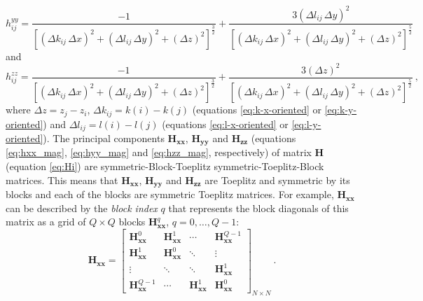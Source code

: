 \begin{equation}
	h^{yy}_{ij} = \frac{-1}{ \left[ 
		\left( \Delta k_{ij} \, \Delta x \right)^{2} + 
		\left( \Delta l_{ij} \, \Delta y \right)^{2} + 
		\left( \Delta z \right)^{2} \right]^{\frac{3}{2}}} + 
	\frac{3 (\Delta l_{ij} \, \Delta y )^{2}}{\left[ 
		\left( \Delta k_{ij} \, \Delta x \right)^{2} + 
		\left( \Delta l_{ij} \, \Delta y \right)^{2} + 
		\left( \Delta z \right)^{2} \right]^{\frac{5}{2}}} \: 
	\label{eq:hyy_mag}
\end{equation}
and
\begin{equation}
	h^{zz}_{ij} = \frac{-1}{ \left[ 
		\left( \Delta k_{ij} \, \Delta x \right)^{2} + 
		\left( \Delta l_{ij} \, \Delta y \right)^{2} + 
		\left( \Delta z \right)^{2} \right]^{\frac{3}{2}}} + 
	\frac{3 (\Delta z )^{2}}{\left[ 
		\left( \Delta k_{ij} \, \Delta x \right)^{2} + 
		\left( \Delta l_{ij} \, \Delta y \right)^{2} + 
		\left( \Delta z \right)^{2} \right]^{\frac{5}{2}}} \: ,
	\label{eq:hzz_mag}
\end{equation}
where $\Delta z = z_j - z_i$, $\Delta k_{ij} =k(i) - k(j)$ (equations \ref{eq:k-x-oriented} or \ref{eq:k-y-oriented}) and $\Delta l_{ij} = l(i) - l(j)$ (equations \ref{eq:l-x-oriented} or \ref{eq:l-y-oriented}).
The principal components $\mathbf{H_{xx}}$, $\mathbf{H_{yy}}$ and $\mathbf{H_{zz}}$ (equations \ref{eq:hxx_mag}, \ref{eq:hyy_mag} and \ref{eq:hzz_mag}, respectively) of matrix $\mathbf{H}$ (equation \ref{eq:Hi}) are symmetric-Block-Toeplitz symmetric-Toeplitz-Block matrices. This means that $\mathbf{H_{xx}}$, $\mathbf{H_{yy}}$ and $\mathbf{H_{zz}}$ are Toeplitz and symmetric by its blocks and each of the blocks are symmetric Toeplitz matrices. 
For example, $\mathbf{H_{xx}}$ can be described by the \textit{block index} $q$ that represents the block diagonals of this matrix as a grid of $Q \times Q$ blocks $\mathbf{H}^{q}_\mathbf{xx}$, $q = 0, \dots, Q - 1$:
\begin{equation}
\mathbf{H_{xx}} = \begin{bmatrix}
\mathbf{H}^{0}_\mathbf{xx}  & \mathbf{H}^{1}_\mathbf{xx} & \cdots         & \mathbf{H}^{Q-1}_\mathbf{xx} \\
\mathbf{H}^{1}_\mathbf{xx}  & \mathbf{H}^{0}_\mathbf{xx} & \ddots         & \vdots           \\ 
\vdots           & \ddots         & \ddots         & \mathbf{H}^{1}_\mathbf{xx}   \\
\mathbf{H}^{Q-1}_\mathbf{xx} & \cdots         & \mathbf{H}^{1}_\mathbf{xx} & \mathbf{H}^{0}_\mathbf{xx}                
\end{bmatrix}_{N \times N} \: .
\label{eq:BTTB_Hxx}
\end{equation}
